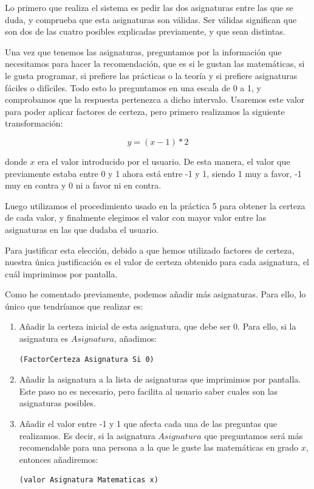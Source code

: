 \documentclass[11pt,a4paper]{article}
\begin{document}
Lo primero que realiza el sistema es pedir las dos asignaturas entre las que se duda, y comprueba que esta asignaturas son válidas. Ser válidas significan que son dos de las cuatro posibles explicadas previamente, y que sean distintas.

Una vez que tenemos las asignaturas, preguntamos por la información que necesitamos para hacer la recomendación, que es si le gustan las matemáticas, si le gusta programar, si prefiere las prácticas o la teoría y si prefiere asignaturas fáciles o difíciles. Todo esto lo preguntamos en una escala de 0 a 1, y comprobamos que la respuesta pertenezca a dicho intervalo. Usaremos este valor para poder aplicar factores de certeza, pero primero realizamos la siguiente transformación:

$$y = (x-1) * 2$$

donde $x$ era el valor introducido por el usuario. De esta manera, el valor que previamente estaba entre 0 y 1 ahora está entre -1 y 1, siendo 1 muy a favor, -1 muy en contra y 0 ni a favor ni en contra.

Luego utilizamos el procedimiento usado en la práctica 5 para obtener la certeza de cada valor, y finalmente elegimos el valor con mayor valor entre las asignaturas en las que dudaba el usuario.

Para justificar esta elección, debido a que hemos utilizado factores de certeza, nuestra única justificación es el valor de certeza obtenido para cada asignatura, el cuál imprimimos por pantalla.

Como he comentado previamente, podemos añadir más asignaturas. Para ello, lo único que tendríamos que realizar es:

\begin{enumerate}[label = \arabic*.]
\item Añadir la certeza inicial de esta asignatura, que debe ser 0. Para ello, si la asignatura es $Asignatura$, añadimos:
\begin{lstlisting}
(FactorCerteza Asignatura Si 0)
\end{lstlisting}
\item Añadir la asignatura a la lista de asignaturas que imprimimos por pantalla. Este paso no es necesario, pero facilita al usuario saber cuales son las asignaturas posibles.
\item Añadir el valor entre -1 y 1 que afecta cada una de las preguntas que realizamos. Es decir, si la asignatura $Asignatura$ que preguntamos será más recomendable para una persona a la que le guste las matemáticas en grado $x$, entonces añadiremos:
\begin{lstlisting}
(valor Asignatura Matematicas x)
\end{lstlisting}
\end{enumerate}
\end{document}
